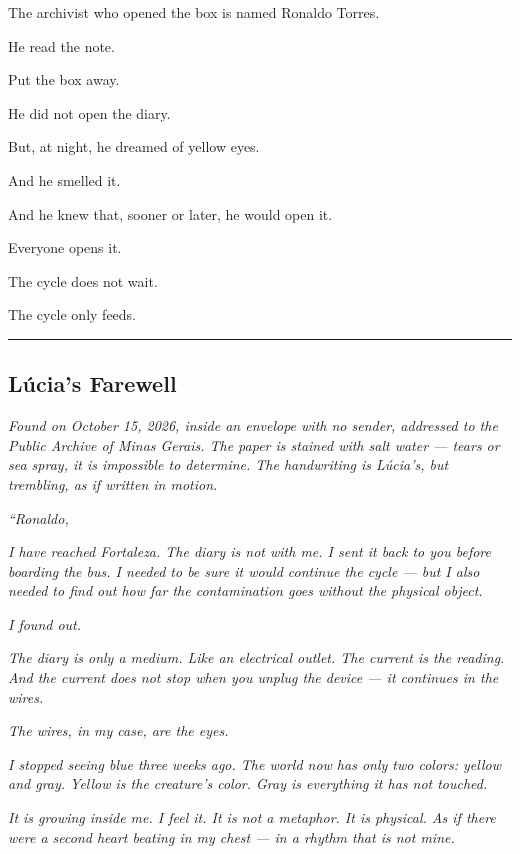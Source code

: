\noindent The archivist who opened the box is named Ronaldo Torres.

\noindent He read the note.

\noindent Put the box away.

\noindent He did not open the diary.

\noindent But, at night, he dreamed of yellow eyes.

\noindent And he smelled it.

\noindent And he knew that, sooner or later, he would open it.

\noindent Everyone opens it.

\noindent The cycle does not wait.

\noindent The cycle only feeds.

\vspace{0.5em}\noindent\rule{\textwidth}{0.5pt}\vspace{0.5em}

\subsection*{Lúcia's Farewell}

\noindent \textit{Found on October 15, 2026, inside an envelope with no sender, addressed to the Public Archive of Minas Gerais. The paper is stained with salt water --- tears or sea spray, it is impossible to determine. The handwriting is Lúcia's, but trembling, as if written in motion.}

\noindent \textit{\textquotedblleft{}Ronaldo,}

\noindent \textit{I have reached Fortaleza. The diary is not with me. I sent it back to you before boarding the bus. I needed to be sure it would continue the cycle --- but I also needed to find out how far the contamination goes without the physical object.}

\noindent \textit{I found out.}

\noindent \textit{The diary is only a medium. Like an electrical outlet. The current is the reading. And the current does not stop when you unplug the device --- it continues in the wires.}

\noindent \textit{The wires, in my case, are the eyes.}

\noindent \textit{I stopped seeing blue three weeks ago. The world now has only two colors: yellow and gray. Yellow is the creature's color. Gray is everything it has not touched.}

\noindent \textit{It is growing inside me. I feel it. It is not a metaphor. It is physical. As if there were a second heart beating in my chest --- in a rhythm that is not mine.}

